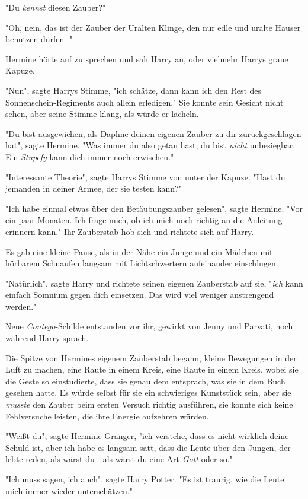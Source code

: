 {"Du \emph{kennst} diesen Zauber?"

"Oh, nein, das ist der Zauber der Uralten Klinge, den nur edle und uralte Häuser benutzen dürfen -"

Hermine hörte auf zu sprechen und sah Harry an, oder vielmehr Harrys graue Kapuze.

"Nun", sagte Harrys Stimme, "ich schätze, dann kann ich den Rest des Sonnenschein-Regiments auch allein erledigen." Sie konnte sein Gesicht nicht sehen, aber seine Stimme klang, als würde er lächeln.

"Du bist ausgewichen, als Daphne deinen eigenen Zauber zu dir zurückgeschlagen hat", sagte Hermine. "Was immer du also getan hast, du bist \emph{nicht} unbesiegbar. Ein \emph{Stupefy} kann dich immer noch erwischen."

"Interessante Theorie", sagte Harrys Stimme von unter der Kapuze. "Hast du jemanden in deiner Armee, der sie testen kann?"

"Ich habe einmal etwas über den Betäubungszauber gelesen", sagte Hermine. "Vor ein paar Monaten. Ich frage mich, ob ich mich noch richtig an die Anleitung erinnern kann." Ihr Zauberstab hob sich und richtete sich auf Harry.

Es gab eine kleine Pause, als in der Nähe ein Junge und ein Mädchen mit hörbarem Schnaufen langsam mit Lichtschwertern aufeinander einschlugen.

"Natürlich", sagte Harry und richtete seinen eigenen Zauberstab auf sie, "\emph{ich} kann einfach Somnium gegen dich einsetzen. Das wird viel weniger anstrengend werden."

Neue \emph{Contego}-Schilde entstanden vor ihr, gewirkt von Jenny und Parvati, noch während Harry sprach.

Die Spitze von Hermines eigenem Zauberstab begann, kleine Bewegungen in der Luft zu machen, eine Raute in einem Kreis, eine Raute in einem Kreis, wobei sie die Geste so einstudierte, dass sie genau dem entsprach, was sie in dem Buch gesehen hatte. Es würde selbst für sie ein schwieriges Kunststück sein, aber sie \emph{musste} den Zauber beim ersten Versuch richtig ausführen, sie konnte sich keine Fehlversuche leisten, die ihre Energie aufzehren würden.

"Weißt du", sagte Hermine Granger, "ich verstehe, dass es nicht wirklich deine Schuld ist, aber ich habe es langsam satt, dass die Leute über den Jungen, der lebte reden, als wärst du - als wärst du eine Art \emph{Gott} oder so."

"Ich muss sagen, ich auch", sagte Harry Potter. "Es ist traurig, wie die Leute mich immer wieder unterschätzen."

}
